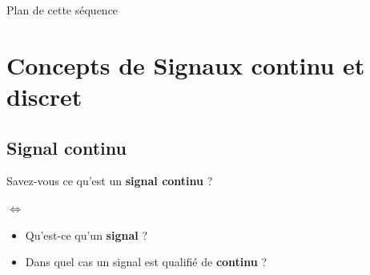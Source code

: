 \documentclass[a4paper,11pt]{beamer}
\begin{document}
 
\begin{frame}{Plan de cette séquence}
	\tableofcontents[hideallsubsections]
\end{frame}


\section{Concepts de Signaux continu et discret}
\subsection{Signal continu} 
\begin{frame}
\centering
Savez-vous ce qu'est un \textbf{signal continu} ?

\pause
\vspace{1cm}
\huge $\Leftrightarrow$ 

\small
\vspace{1cm} 
\begin{itemize}
  \item Qu'est-ce qu'un \textbf{signal} ?
  \item Dans quel cas un signal est qualifié de \textbf{continu} ?
\end{itemize}
\end{frame}
\end{document}
